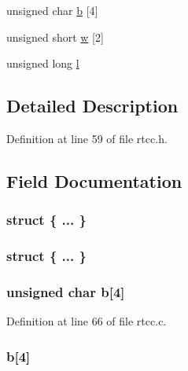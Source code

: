 \begin{DoxyCompactItemize}
\begin{tabbing}
\end{tabbing}\item 
unsigned char \hyperlink{unionrtcc_date_a61a5d0fa7c6684d64d4709fbec39695a}{b} \mbox{[}4\mbox{]}
\item 
unsigned short \hyperlink{unionrtcc_date_acd7a32916d80e0556e2e0348be16a805}{w} \mbox{[}2\mbox{]}
\item 
unsigned long \hyperlink{unionrtcc_date_a99612d7a42af4d8bc748c9de9089b41e}{l}
\end{DoxyCompactItemize}


\subsection{Detailed Description}


Definition at line 59 of file rtcc.\-h.



\subsection{Field Documentation}
\hypertarget{unionrtcc_date_a3c540d193dd37431c763c5ccd28b955b}{\subsubsection[{"@3}]{\setlength{\rightskip}{0pt plus 5cm}struct \{ ... \} }}\label{unionrtcc_date_a3c540d193dd37431c763c5ccd28b955b}
\hypertarget{unionrtcc_date_ac40e8a70bf6529720fd1da94a246c7e2}{\subsubsection[{"@38}]{\setlength{\rightskip}{0pt plus 5cm}struct \{ ... \} }}\label{unionrtcc_date_ac40e8a70bf6529720fd1da94a246c7e2}
\hypertarget{unionrtcc_date_a61a5d0fa7c6684d64d4709fbec39695a}{
\subsubsection[{b}]{\setlength{\rightskip}{0pt plus 5cm}unsigned char b\mbox{[}4\mbox{]}}}\label{unionrtcc_date_a61a5d0fa7c6684d64d4709fbec39695a}


Definition at line 66 of file rtcc.\-c.

\hypertarget{unionrtcc_date_a462b9a1d97366cdca568e1212ab06255}{
\subsubsection[{b}]{ b\mbox{[}4\mbox{]}}}\label{unionrtcc_date_a462b9a1d97366cdca568e1212ab06255}


